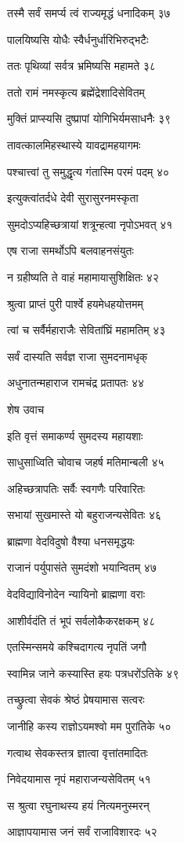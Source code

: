 तस्मै सर्वं समर्प्य त्वं राज्यमृद्धं धनादिकम् ३७

पालयिष्यसि योधैः स्वैर्धनुर्धारिभिरुद्भटैः

ततः पृथिव्यां सर्वत्र भ्रमिष्यसि महामते ३८

ततो रामं नमस्कृत्य ब्रह्मेंद्रेशादिसेवितम्

मुक्तिं प्राप्स्यसि दुष्प्रापां योगिभिर्यमसाधनैः ३९

तावत्कालमिहस्थास्ये यावद्रामहयागमः

पश्चात्त्वां तु समुद्धृत्य गंतास्मि परमं पदम् ४०

इत्युक्त्वांतर्दधे देवी सुरासुरनमस्कृता

सुमदोऽप्यहिच्छत्रायां शत्रून्हत्वा नृपोऽभवत् ४१

एष राजा समर्थोऽपि बलवाहनसंयुतः

न ग्रहीष्यति ते वाहं महामायासुशिक्षितः ४२

श्रुत्वा प्राप्तं पुरी पार्श्वे हयमेधहयोत्तमम्

त्वां च सर्वैर्महाराजैः सेवितांघ्रिं महामतिम् ४३

सर्वं दास्यति सर्वज्ञ राजा सुमदनामधृक्

अधुनातन्महाराज रामचंद्र प्रतापतः ४४

शेष उवाच

इति वृत्तं समाकर्ण्य सुमदस्य महायशाः

साधुसाध्विति चोवाच जहर्ष मतिमान्बली ४५

अहिच्छत्रापतिः सर्वैः स्वगणैः परिवारितः

सभायां सुखमास्ते यो बहुराजन्यसेवितः ४६

ब्राह्मणा वेदविदुषो वैश्या धनसमृद्धयः

राजानं पर्युपासंते सुमदंशो भयान्वितम् ४७

वेदविद्याविनोदेन न्यायिनो ब्राह्मणा वराः

आशीर्वदंति तं भूपं सर्वलोकैकरक्षकम् ४८

एतस्मिन्समये कश्चिदागत्य नृपतिं जगौ

स्वामिन्न जाने कस्यास्ति हयः पत्रधरोंऽतिके ४९

तच्छ्रुत्वा सेवकं श्रेष्ठं प्रेषयामास सत्वरः

जानीहि कस्य राज्ञोऽयमश्वो मम पुरांतिके ५०

गत्वाथ सेवकस्तत्र ज्ञात्वा वृत्तांतमादितः

निवेदयामास नृपं महाराजन्यसेवितम् ५१

स श्रुत्वा रघुनाथस्य हयं नित्यमनुस्मरन्

आज्ञापयामास जनं सर्वं राजाविशारदः ५२


